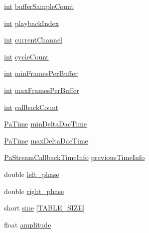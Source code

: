 \begin{DoxyCompactItemize}
\hyperlink{xmltok_8h_a5a0d4a5641ce434f1d23533f2b2e6653}{int} \hyperlink{structpa_test_data_a4ecc0fc87f4956e16133cc02e938a3f2}{buffer\+Sample\+Count}
\item 
\hyperlink{xmltok_8h_a5a0d4a5641ce434f1d23533f2b2e6653}{int} \hyperlink{structpa_test_data_afe1f7fbbc358ba3e4ed51012544002b4}{playback\+Index}
\item 
\hyperlink{xmltok_8h_a5a0d4a5641ce434f1d23533f2b2e6653}{int} \hyperlink{structpa_test_data_a392da0b67204d30cb209843f7aaff2db}{current\+Channel}
\item 
\hyperlink{xmltok_8h_a5a0d4a5641ce434f1d23533f2b2e6653}{int} \hyperlink{structpa_test_data_ae2eebe1873d8cc4a138842a57f6d112d}{cycle\+Count}
\item 
\hyperlink{xmltok_8h_a5a0d4a5641ce434f1d23533f2b2e6653}{int} \hyperlink{structpa_test_data_a54a4f685949c89a98b4e45e94ccbc5fd}{min\+Frames\+Per\+Buffer}
\item 
\hyperlink{xmltok_8h_a5a0d4a5641ce434f1d23533f2b2e6653}{int} \hyperlink{structpa_test_data_aae99bce428d398f6650c2436b2f76c7d}{max\+Frames\+Per\+Buffer}
\item 
\hyperlink{xmltok_8h_a5a0d4a5641ce434f1d23533f2b2e6653}{int} \hyperlink{structpa_test_data_a442020960f72390def205fc39be98203}{callback\+Count}
\item 
\hyperlink{portaudio_8h_af17a7e6d0471a23071acf8dbd7bbe4bd}{Pa\+Time} \hyperlink{structpa_test_data_af8e0869352206e07bd4003ad47e0434c}{min\+Delta\+Dac\+Time}
\item 
\hyperlink{portaudio_8h_af17a7e6d0471a23071acf8dbd7bbe4bd}{Pa\+Time} \hyperlink{structpa_test_data_a9a96e58f6fd9e5b201ae2aa3fd74980e}{max\+Delta\+Dac\+Time}
\item 
\hyperlink{struct_pa_stream_callback_time_info}{Pa\+Stream\+Callback\+Time\+Info} \hyperlink{structpa_test_data_a7b16cf9508f2d5bf94b8fdf60d3f903d}{previous\+Time\+Info}
\item 
double \hyperlink{structpa_test_data_a995dd5ec4feb90e96f7f625b7e4bf9fb}{left\+\_\+phase}
\item 
double \hyperlink{structpa_test_data_acb76ae49b8bcc375f036e491bd24fc8a}{right\+\_\+phase}
\item 
short \hyperlink{structpa_test_data_acb011e779e4d245f4643fd3c3143e5b3}{sine} \mbox{[}\hyperlink{sine_8cxx_ada4ebb227211f96616c9e6681a944bc1}{T\+A\+B\+L\+E\+\_\+\+S\+I\+ZE}\mbox{]}
\item 
float \hyperlink{structpa_test_data_ad5cf5eb9b03e0b77bb4e10bfdad97f89}{amplitude}
\item 

\end{DoxyCompactItemize}
